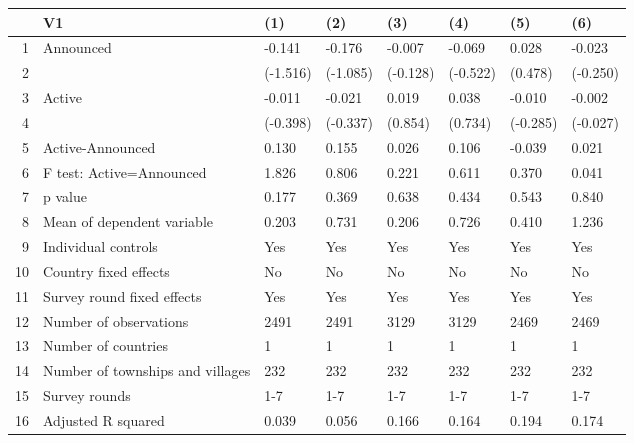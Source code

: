 \begin{table}[ht]
\centering
\begin{tabular}{rlllllll}
  \hline
 & V1 & (1) & (2) & (3) & (4) & (5) & (6) \\ 
  \hline
1 & Announced & -0.141 & -0.176 & -0.007 & -0.069 & 0.028 & -0.023 \\ 
  2 &  & (-1.516) & (-1.085) & (-0.128) & (-0.522) & (0.478) & (-0.250) \\ 
  3 & Active & -0.011 & -0.021 & 0.019 & 0.038 & -0.010 & -0.002 \\ 
  4 &  & (-0.398) & (-0.337) & (0.854) & (0.734) & (-0.285) & (-0.027) \\ 
  5 & Active-Announced & 0.130 & 0.155 & 0.026 & 0.106 & -0.039 & 0.021 \\ 
  6 & F test: Active=Announced & 1.826 & 0.806 & 0.221 & 0.611 & 0.370 & 0.041 \\ 
  7 & p value & 0.177 & 0.369 & 0.638 & 0.434 & 0.543 & 0.840 \\ 
  8 & Mean of dependent variable & 0.203 & 0.731 & 0.206 & 0.726 & 0.410 & 1.236 \\ 
  9 & Individual controls & Yes & Yes & Yes & Yes & Yes & Yes \\ 
  10 & Country fixed effects & No & No & No & No & No & No \\ 
  11 & Survey round fixed effects & Yes & Yes & Yes & Yes & Yes & Yes \\ 
  12 & Number of observations & 2491 & 2491 & 3129 & 3129 & 2469 & 2469 \\ 
  13 & Number of countries & 1 & 1 & 1 & 1 & 1 & 1 \\ 
  14 & Number of townships and villages & 232 & 232 & 232 & 232 & 232 & 232 \\ 
  15 & Survey rounds & 1-7 & 1-7 & 1-7 & 1-7 & 1-7 & 1-7 \\ 
  16 & Adjusted R squared & 0.039 & 0.056 & 0.166 & 0.164 & 0.194 & 0.174 \\ 
   \hline
\end{tabular}
\end{table}
